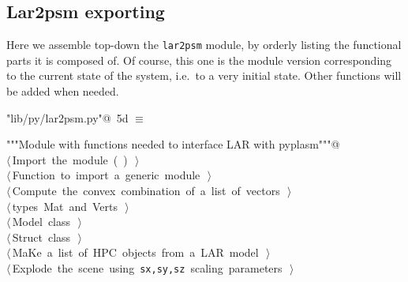 \documentclass[11pt,oneside]{article}	%
\begin{document}
\subsection{Lar2psm exporting}
\label{sec:lar2psm}
Here we assemble top-down the \texttt{lar2psm} module, by orderly listing the functional parts it is composed of. Of course, this one is the module version corresponding to the current state of the system, i.e.~to a very initial state. Other functions will be added when needed.
\begin{flushleft} \small \label{scrap15}
\protect{}\verb@"lib/py/lar2psm.py"@\nobreak\ {\footnotesize 5d }$\equiv$
\vspace{-1ex}
\begin{list}{}{} \item
\mbox{}\verb@"""Module with functions needed to interface LAR with pyplasm"""@\\
\mbox{}\verb@@\hbox{$\langle\,$Import the module\nobreak\ ({\footnotesize {}\label{scrap16}
 }\mbox{}\verb@simplexn@ ) {\footnotesize {}}$\,\rangle$}\verb@@\\
\mbox{}\verb@@\hbox{$\langle\,$Function to import a generic module\nobreak\ {\footnotesize {}}$\,\rangle$}\verb@@\\
\mbox{}\verb@@\hbox{$\langle\,$Compute the convex combination of a list of vectors\nobreak\ {\footnotesize {}}$\,\rangle$}\verb@@\\
\mbox{}\verb@@\hbox{$\langle\,$types Mat and Verts\nobreak\ {\footnotesize {}}$\,\rangle$}\verb@@\\
\mbox{}\verb@@\hbox{$\langle\,$Model class\nobreak\ {\footnotesize {}}$\,\rangle$}\verb@@\\
\mbox{}\verb@@\hbox{$\langle\,$Struct class\nobreak\ {\footnotesize {}}$\,\rangle$}\verb@@\\
\mbox{}\verb@@\hbox{$\langle\,$MaKe a list of HPC objects from a LAR model\nobreak\ {\footnotesize {}}$\,\rangle$}\verb@@\\
\mbox{}\verb@@\hbox{$\langle\,$Explode the scene using \texttt{sx,sy,sz} scaling parameters\nobreak\ {\footnotesize {}}$\,\rangle$}\verb@@\\
\mbox{}\verb@@{\NWsep}
\end{list}
\vspace{-2ex}
\end{flushleft}
\end{document}
